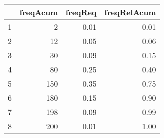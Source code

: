 \begin{table}[ht]
\centering
\begin{tabular}{rrrr}
  \hline
 & freqAcum & freqReq & freqRelAcum \\ 
  \hline
1 &   2 & 0.01 & 0.01 \\ 
  2 &  12 & 0.05 & 0.06 \\ 
  3 &  30 & 0.09 & 0.15 \\ 
  4 &  80 & 0.25 & 0.40 \\ 
  5 & 150 & 0.35 & 0.75 \\ 
  6 & 180 & 0.15 & 0.90 \\ 
  7 & 198 & 0.09 & 0.99 \\ 
  8 & 200 & 0.01 & 1.00 \\ 
   \hline
\end{tabular}
\end{table}
